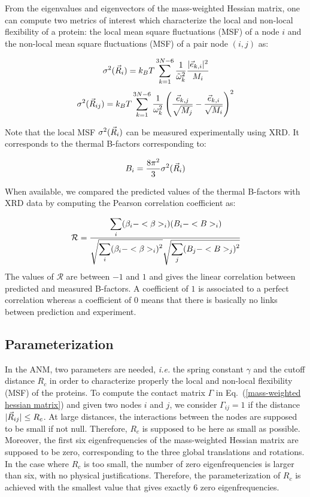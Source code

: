 From the eigenvalues and eigenvectors of the mass-weighted Hessian matrix, one can compute two metrics of interest which characterize the local and non-local flexibility of a protein: the local mean square fluctuations (MSF) of a node $i$ and the non-local mean square fluctuations (MSF) of a pair node $(i,j)$ as:

\begin{equation}
	\label{thermal B-factors}
	\sigma^2(\vec{R}_i) = k_BT\sum_{k=1}^{3N-6}\frac{1}{\tilde{\omega}_k^2} \cfrac{\vert\vec{e}_{k, i}\vert^2}{M_i}
\end{equation}
\begin{equation}
	\label{metric dij}
	\sigma^2 (\vec{R}_{ij}) = k_BT\sum_{k=1}^{3N-6} \frac{1}{\omega_k^2}\left( \frac{\vec{e}_{k, j}}{\sqrt{M_j}} - \frac{\vec{e}_{k, i}}{\sqrt{M_i}} \right)^2
\end{equation}

Note that the local MSF $\sigma^2(\vec{R}_i)$ can be measured experimentally using XRD. It corresponds to the thermal B-factors corresponding to:

\begin{equation}
	B_i=\dfrac{8\pi^2}{3}\sigma^2(\vec{R}_i)
\end{equation}

When available, we compared the predicted values of the thermal B-factors with XRD data by computing the Pearson correlation coefficient as:

\begin{equation}
	\label{pearsonr}
	\mathcal{R} = \cfrac{\displaystyle\sum_i (\beta_i - <\beta>_i)(B_i - <B>_i)}{\sqrt{\displaystyle\sum_i(\beta_i - <\beta>_i)^2}\sqrt{\displaystyle\sum_j(B_j - <B>_j)^2}}
\end{equation}
The values of $\mathcal{R}$ are between $-1$ and $1$ and gives the linear correlation between predicted and measured B-factors. A coefficient of $1$ is associated to a perfect correlation whereas a coefficient of $0$ means that there is basically no links between prediction and experiment. 

\subsection{Parameterization}

In the ANM, two parameters are needed, \textit{i.e.} the spring constant $\gamma$ and the cutoff distance $R_c$ in order to characterize properly the local and non-local flexibility (MSF) of the proteins. To compute the contact matrix $\Gamma$ in Eq.~(\ref{mass-weighted hessian matrix}) and given two nodes $i$ and $j$, we consider $\Gamma_{ij} = 1$ if the distance $\vert\vec{R}_{ij}\vert \leq R_c$. At large distances, the interactions between the nodes are supposed to be small if not null. Therefore, $R_c$ is supposed to be here as small as possible. Moreover, the first six eigenfrequencies of the mass-weighted Hessian matrix are supposed to be zero, corresponding to the three global translations and rotations. In the case where $R_c$ is too small, the number of zero eigenfrequencies is larger than six, with no physical justifications. Therefore, the parameterization of $R_c$ is achieved with the smallest value that gives exactly $6$ zero eigenfrequencies. 


